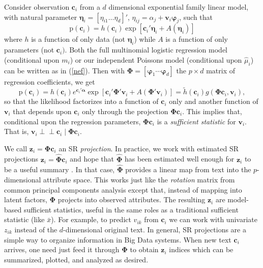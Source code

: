 \documentclass[12pt]{article}
\newcommand{\bs}[1]{\boldsymbol{#1}}
\newcommand{\mr}[1]{\mathrm{#1}}
\newcommand{\bm}[1]{\mathbf{#1}}
\newcommand{\indep}{\perp\!\!\!\perp}
\begin{document}
Consider observation $\bm{c}_i$ from a $d$ dimensional exponential family
linear model, with natural parameter $\bs{\eta}_i = [\eta_{i1} \ldots
\eta_d]'$,  $\eta_{ij} = \alpha_j + \bm{v}_i\bs{\varphi}_j$, such that
\begin{equation}\label{nef}
\mr{p}(\bm{c}_i) = h(\bm{c}_i)\exp\left[\bm{c}_i'\bs{\eta}_i + A(\bs{\eta}_i)\right]
\end{equation}
where $h$ is a function of only data (not $\bs{\eta}_i$) while $A$ is a
function of only parameters (not $\bm{c}_i)$.  Both the full
multinomial logistic regression model (conditional upon $m_i$) or our
independent Poissons model (conditional upon $\hat\mu_i$) can be written as in
(\ref{nef}). Then with $\bs{\Phi} = [\bs{\varphi}_1 \cdots
\bs{\varphi}_d]$ the $p\times d$ matrix of regression coefficients, we get
\begin{equation}\label{srproof}
\mr{p}(\bm{c}_i) = h(\bm{c}_i)e^{\bm{c}_i'\bs{\alpha}}
\exp\left[\bm{c}_i'\bs{\Phi}'\bm{v}_i + A(\bs{\Phi}'\bm{v}_i)\right] = 
\tilde h(\bm{c}_i)g(\bs{\Phi}\bm{c}_i,\bm{v}_i),
\end{equation}
so that the likelihood factorizes into a function of $\bm{c}_i$ only and
another function of $\bm{v}_i$ that depends upon $\bm{c}_i$ only through the
projection $\bs{\Phi}\bm{c}_i$.  This implies that, conditional upon
the regression parameters,  $\bs{\Phi}\bm{c}_i$ is a {\it
sufficient statistic} for $\bm{v}_i$.  That is, $\bm{v}_i \indep \bm{c}_i \mid
\bs{\Phi}\bm{c}_i$.

We call $\bm{z}_i = \bs{\Phi}\bm{c}_i$ an SR {\it projection}. In practice, we
work with estimated SR projections $\bm{z}_i =  \bs{\hat\Phi}\bm{c}_i$ and
hope that $\bs{\hat\Phi}$ has been estimated well enough for $\bm{z}_i$ to be
a useful summary \citep[see][for discussion]{taddy_rejoinder:_2013}. In that
case, $\bm{\hat\Phi}$ provides a linear map from text into the $p$-dimensional
attribute space.  This works just like the {\it rotation} matrix from common
principal components analysis except that, instead of mapping into latent
factors,  $\bs{\Phi}$ projects into observed attributes. The resulting
$\bm{z}_i$ are model-based sufficient statistics, useful in the same roles
as a traditional sufficient statistic (like $\bar x$). For example, to predict
$v_{ik}$ from $\bm{c}_i$ we can work with  univariate $z_{ik}$ instead of the
$d$-dimensional original text. In general, SR projections are a simple way to
organize information in Big Data systems.  When new text $\bm{c}_i$ arrives,
one need just feed it through $\bs{\Phi}$ to obtain $\bm{z}_i$ indices which
can be summarized, plotted, and analyzed as desired.
\end{document}
